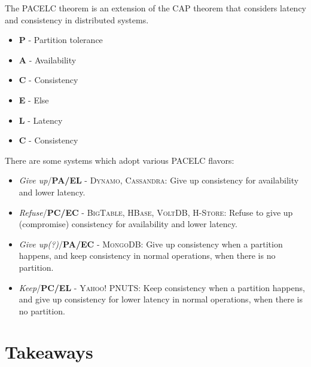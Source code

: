 \begin{definition}
   The PACELC theorem is an extension of the CAP theorem that considers latency and consistency in distributed systems.
   \begin{itemize}
   	\item \textbf{P} - Partition tolerance
   	\item \textbf{A} - Availability
   	\item \textbf{C} - Consistency
   	\item \textbf{E} - Else
   	\item \textbf{L} - Latency
   	\item \textbf{C} - Consistency
   \end{itemize}
\end{definition}


There are some systems which adopt various PACELC flavors:
\begin{itemize}
	\item \textit{Give up}/\textbf{PA/EL} - \textsc{Dynamo}, \textsc{Cassandra}: Give up consistency for availability and lower latency.
	\item \textit{Refuse}/\textbf{PC/EC} - \textsc{BigTable}, \textsc{HBase}, \textsc{VoltDB}, \textsc{H-Store}: Refuse to give up (compromise) consistency for availability and lower latency.
	\item \textit{Give up(?)}/\textbf{PA/EC} - \textsc{MongoDB}: Give up consistency when a partition happens, and keep consistency in normal operations, when there is no partition.
	\item \textit{Keep}/\textbf{PC/EL} - \textsc{Yahoo! PNUTS}: Keep consistency when a partition happens, and give up consistency for lower latency in normal operations, when there is no partition.
\end{itemize}
\section{Takeaways}

